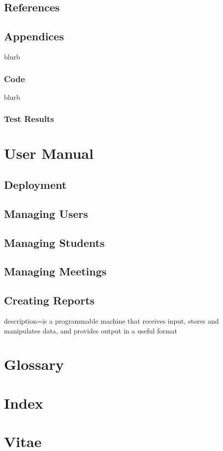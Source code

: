 \documentclass{journal}
\begin{document}
\newpage
\subsection{References}



\newpage 

\subsection{Appendices}
blurb
\subsubsection{Code}
blurb 
\subsubsection{Test Results}

 
\section{User Manual}

\subsection{Deployment}

\subsection{Managing Users}

\subsection{Managing Students}

\subsection{Managing Meetings}

\subsection{Creating Reports}



{
  description={is a programmable machine that receives input,
               stores and manipulates data, and provides
               output in a useful format}
}
\newpage 
\section{Glossary}
\printglossaries
\section{Index}
\section{Vitae}
\end{document}
